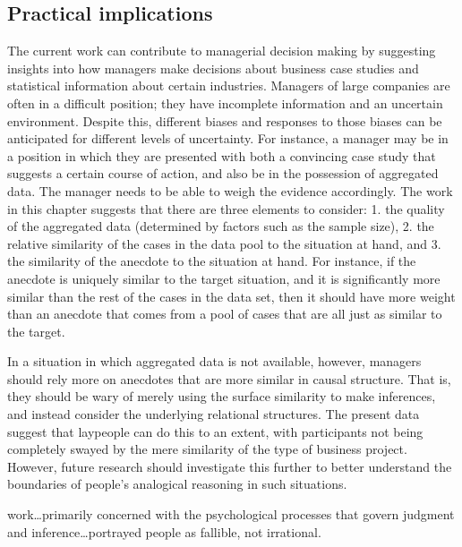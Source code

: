\documentclass[a4paper, nobind, dvipsnames]{templates/ociamthesis}
\theoremstyle{definition}
\theoremstyle{definition}
\theoremstyle{definition}
\theoremstyle{definition}
\theoremstyle{remark}
\begin{document}
\subsection{Practical implications}

The current work can contribute to managerial decision making by suggesting
insights into how managers make decisions about business case studies and
statistical information about certain industries. Managers of large companies
are often in a difficult position; they have incomplete information and an
uncertain environment. Despite this, different biases and responses to those
biases can be anticipated for different levels of uncertainty. For instance, a
manager may be in a position in which they are presented with both a convincing
case study that suggests a certain course of action, and also be in the
possession of aggregated data. The manager needs to be able to weigh the
evidence accordingly. The work in this chapter suggests that there are three
elements to consider: 1. the quality of the aggregated data (determined by
factors such as the sample size), 2. the relative similarity of the cases in the
data pool to the situation at hand, and 3. the similarity of the anecdote to the
situation at hand. For instance, if the anecdote is uniquely similar to the
target situation, and it is significantly more similar than the rest of the
cases in the data set, then it should have more weight than an anecdote that
comes from a pool of cases that are all just as similar to the target.

In a situation in which aggregated data is not available, however, managers
should rely more on anecdotes that are more similar in causal structure. That
is, they should be wary of merely using the surface similarity to make
inferences, and instead consider the underlying relational structures. The
present data suggest that laypeople can do this to an extent, with participants
not being completely swayed by the mere similarity of the type of business
project. However, future research should investigate this further to better
understand the boundaries of people's analogical reasoning in such situations.

\newpage

\printbibliography[segment=\therefsegment,heading=subbibintoc]



\begin{savequote}
work\ldots primarily concerned with the psychological processes that
govern judgment and inference\ldots portrayed people as fallible, not
irrational.
\end{savequote}
\end{document}
